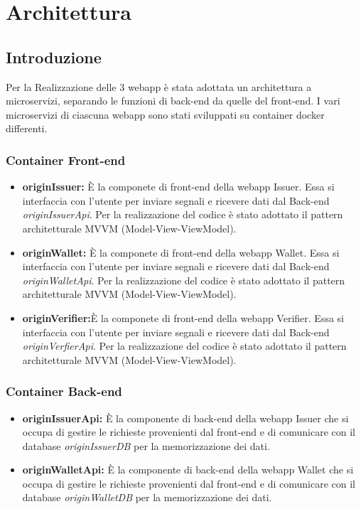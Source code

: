 \section{Architettura}

\subsection{Introduzione}
Per la Realizzazione delle 3 webapp è stata adottata un architettura a microservizi, separando le funzioni di back-end da quelle del front-end. I vari microservizi di ciascuna webapp sono stati sviluppati su container docker differenti.
\subsubsection{Container Front-end}
\begin{itemize}
    \item \textbf{originIssuer:} È la componete di front-end della webapp Issuer. Essa si interfaccia con l'utente per inviare segnali e ricevere dati dal Back-end \textit{originIssuerApi}. Per la realizzazione del codice è stato adottato il pattern architetturale MVVM (Model-View-ViewModel).
    \item \textbf{originWallet:} È la componete di front-end della webapp Wallet. Essa si interfaccia con l'utente per inviare segnali e ricevere dati dal Back-end \textit{originWalletApi}. Per la realizzazione del codice è stato adottato il pattern architetturale MVVM (Model-View-ViewModel).
    \item \textbf{originVerifier:}È la componete di front-end della webapp Verifier. Essa si interfaccia con l'utente per inviare segnali e ricevere dati dal Back-end \textit{originVerfierApi}. Per la realizzazione del codice è stato adottato il pattern architetturale MVVM (Model-View-ViewModel).
\end{itemize}

\subsubsection{Container Back-end}
\begin{itemize}
    \item \textbf{originIssuerApi:} È la componente di back-end della webapp Issuer che si occupa di gestire le richieste provenienti dal front-end e di comunicare con il database \textit{originIssuerDB} per la memorizzazione dei dati.
    \item \textbf{originWalletApi:} È la componente di back-end della webapp Wallet che si occupa di gestire le richieste provenienti dal front-end e di comunicare con il database \textit{originWalletDB} per la memorizzazione dei dati.
\end{itemize}

